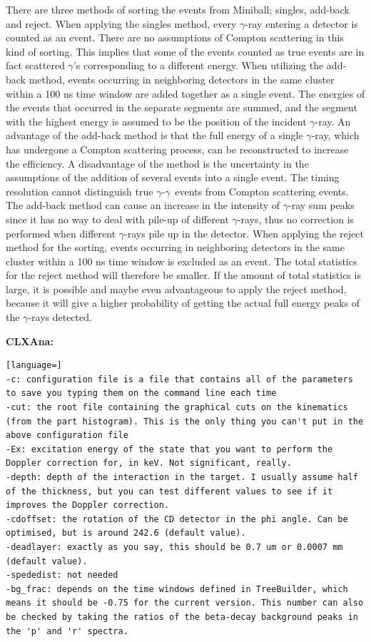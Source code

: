 \documentclass[twoside,english]{uiofysmaster/uiofysmaster}
\newcommand{\ga}{$\gamma$}
\begin{document}
There are three methods of sorting the events from Miniball; singles, add-back and reject. 
When applying the singles method, every \ga-ray entering a detector is counted as an event.
There are no assumptions of Compton scattering in this kind of sorting. 
This implies that some of the events counted as true events are in fact scattered \ga's corresponding to a different energy.
When utilizing the add-back method, events occurring in neighboring detectors in the same cluster within a 100 ns time window are added together as a single event. 
The energies of the events that occurred in the separate segments are summed, and the segment with the highest energy is assumed to be the position of the incident \ga-ray.
An advantage of the add-back method is that the full energy of a single \ga-ray, which has undergone a Compton scattering process, can be reconstructed to increase the efficiency.
A disadvantage of the method is the uncertainty in the assumptions of the addition of several events into a single event. 
The timing resolution cannot distinguish true \ga-\ga\ events from Compton scattering events.
The add-back method can cause an increase in the intensity of \ga-ray sum peaks since it has no way to deal with pile-up of different \ga-rays, thus no correction is performed when different \ga-rays pile up in the detector.
When applying the reject method for the sorting, events occurring in neighboring detectors in the same cluster within a 100 ns time window is excluded as an event. 
The total statistics for the reject method will therefore be smaller. 
If the amount of total statistics is large, it is possible and maybe even advantageous to apply the reject method, because it will give a higher probability of getting the actual full energy peaks of the \ga-rays detected. 




\bigskip




\textbf{CLXAna:}\newline
\begin{lstlisting}[language=]
-c: configuration file is a file that contains all of the parameters to save you typing them on the command line each time
-cut: the root file containing the graphical cuts on the kinematics (from the part histogram). This is the only thing you can't put in the above configuration file
-Ex: excitation energy of the state that you want to perform the Doppler correction for, in keV. Not significant, really.
-depth: depth of the interaction in the target. I usually assume half of the thickness, but you can test different values to see if it improves the Doppler correction.
-cdoffset: the rotation of the CD detector in the phi angle. Can be optimised, but is around 242.6 (default value).
-deadlayer: exactly as you say, this should be 0.7 um or 0.0007 mm (default value).
-spededist: not needed
-bg_frac: depends on the time windows defined in TreeBuilder, which means it should be -0.75 for the current version. This number can also be checked by taking the ratios of the beta-decay background peaks in the 'p' and 'r' spectra.
\end{lstlisting}
\end{document}
